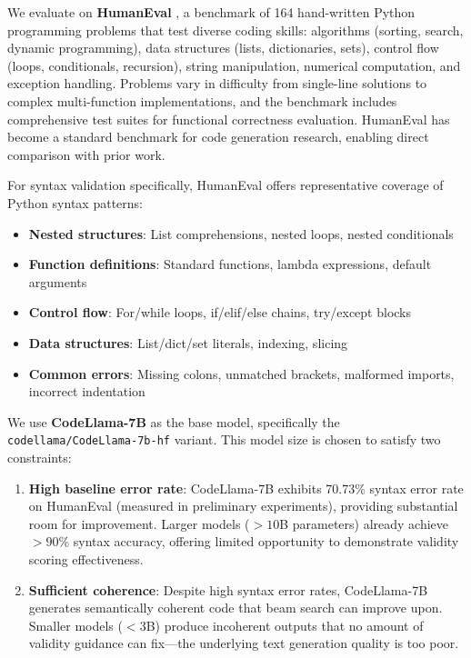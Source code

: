 We evaluate on \textbf{HumanEval} \cite{Chen2021}, a benchmark of 164 hand-written Python programming problems that test diverse coding skills: algorithms (sorting, search, dynamic programming), data structures (lists, dictionaries, sets), control flow (loops, conditionals, recursion), string manipulation, numerical computation, and exception handling. Problems vary in difficulty from single-line solutions to complex multi-function implementations, and the benchmark includes comprehensive test suites for functional correctness evaluation. HumanEval has become a standard benchmark for code generation research, enabling direct comparison with prior work.

For syntax validation specifically, HumanEval offers representative coverage of Python syntax patterns:
\begin{itemize}
\item \textbf{Nested structures}: List comprehensions, nested loops, nested conditionals
\item \textbf{Function definitions}: Standard functions, lambda expressions, default arguments
\item \textbf{Control flow}: For/while loops, if/elif/else chains, try/except blocks
\item \textbf{Data structures}: List/dict/set literals, indexing, slicing
\item \textbf{Common errors}: Missing colons, unmatched brackets, malformed imports, incorrect indentation
\end{itemize}

We use \textbf{CodeLlama-7B} \cite{Roziere2023} as the base model, specifically the \texttt{codellama/CodeLlama-7b-hf} variant. This model size is chosen to satisfy two constraints:

\begin{enumerate}
\item \textbf{High baseline error rate}: CodeLlama-7B exhibits 70.73\% syntax error rate on HumanEval (measured in preliminary experiments), providing substantial room for improvement. Larger models ($>10$B parameters) already achieve $>90$\% syntax accuracy, offering limited opportunity to demonstrate validity scoring effectiveness.

\item \textbf{Sufficient coherence}: Despite high syntax error rates, CodeLlama-7B generates semantically coherent code that beam search can improve upon. Smaller models ($<3$B) produce incoherent outputs that no amount of validity guidance can fix---the underlying text generation quality is too poor.
\end{enumerate}

